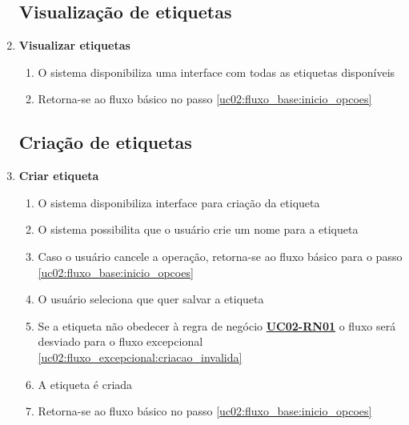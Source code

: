 \documentclass[
	12pt,				%
	oneside,			%
	a4paper,			%
	english,			%
	brazil,				%
	]{abntex2}
\begin{document}
\begin{enumerate}[label=\textbf{UC02-FA{\arabic*}},font=\normalsize]
      
    \subsection{Visualização de etiquetas}
     \item \textbf{\normalsize Visualizar etiquetas}
    \label{uc02:fluxo_alternativo:visualizar_etiquetas}
    \begin{enumerate}[label={\arabic*}.]
        \item O sistema disponibiliza uma interface com todas as etiquetas disponíveis
        \item Retorna-se ao fluxo básico no passo \ref{uc02:fluxo_base:inicio_opcoes}
    \end{enumerate}
    
    \subsection{Criação de etiquetas}
    \item \textbf{\normalsize Criar etiqueta} \label{uc02:fluxo_alternativo:criar_etiqueta}
    \begin{enumerate}[label={\arabic*}.]
        \item O sistema disponibiliza interface para criação da etiqueta \label{uc02:fluxo_alternativo:criar_etiqueta:pode_escrever}
        \item O sistema possibilita que o usuário crie um nome para a etiqueta
        \item Caso o usuário cancele a operação, retorna-se ao fluxo básico para o passo \ref{uc02:fluxo_base:inicio_opcoes}
        \item O usuário seleciona que quer salvar a etiqueta
        \item Se a etiqueta não obedecer à regra de negócio \textbf{\hyperref[uc02:rn01_validar]{UC02-RN01}} o fluxo será desviado para o fluxo excepcional \ref{uc02:fluxo_excepcional:criacao_invalida}
        \item A etiqueta é criada
        \item Retorna-se ao fluxo básico no passo \ref{uc02:fluxo_base:inicio_opcoes}
    \end{enumerate}


\end{enumerate}
\end{document}
